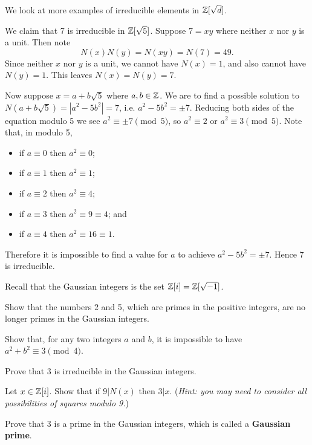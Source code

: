 We look at more examples of irreducible elements in $\mathbb{Z}[\sqrt{d}]$.
\begin{example}
    We claim that 7 is irreducible in $\mathbb{Z}[\sqrt{5}]$. Suppose $7 = xy$ where neither $x$ nor $y$ is a unit. Then note
    \[
        N(x)N(y) = N(xy) = N(7) = 49.
    \]
    Since neither $x$ nor $y$ is a unit, we cannot have $N(x) = 1$, and also cannot have $N(y) = 1$. This leaves $N(x) = N(y) = 7$. 
    
    Now suppose $x = a + b\sqrt{5}$ where $a, b \in \mathbb{Z}$. We are to find a possible solution to $N(a+b\sqrt{5}) = |a^2 - 5b^2| = 7$, i.e. $a^2 - 5b^2 = \pm 7$. Reducing both sides of the equation modulo 5 we see $a^2 \equiv \pm7 \pmod5$, so $a^2 \equiv 2$ or $a^2 \equiv 3 \pmod5$. Note that, in modulo 5,
    \begin{itemize}
        \item if $a \equiv 0$ then $a^2 \equiv 0$;
        \item if $a \equiv 1$ then $a^2 \equiv 1$;
        \item if $a \equiv 2$ then $a^2 \equiv 4$;
        \item if $a \equiv 3$ then $a^2 \equiv 9 \equiv 4$; and
        \item if $a \equiv 4$ then $a^2 \equiv 16 \equiv 1$.
    \end{itemize}
    Therefore it is impossible to find a value for $a$ to achieve $a^2 - 5b^2 = \pm7$. Hence 7 is irreducible.
\end{example}

\begin{exercise}
    Recall that the Gaussian integers is the set $\mathbb{Z}[i] = \mathbb{Z}[\sqrt{-1}]$.
    \begin{partquestions}{\alph*}
        \item Show that the numbers 2 and 5, which are primes in the positive integers, are no longer primes in the Gaussian integers.
        \item \begin{partquestions}{\roman*}
            \item Show that, for any two integers $a$ and $b$, it is impossible to have $a^2 + b^2 \equiv 3 \pmod4$.
            \item Prove that 3 is irreducible in the Gaussian integers.
            \item Let $x \in \mathbb{Z}[i]$. Show that if $9 \vert N(x)$ then $3 \vert x$.\newline
            (\textit{Hint: you may need to consider all possibilities of squares modulo 9.})
            \item Prove that 3 is a prime in the Gaussian integers, which is called a \textbf{Gaussian prime}.
        \end{partquestions}
    \end{partquestions}
\end{exercise}

